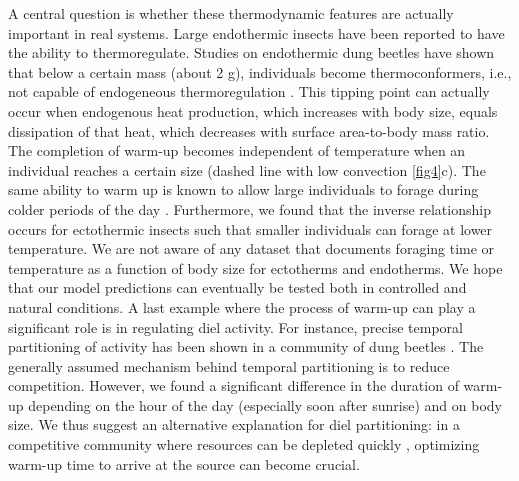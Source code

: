 A central question is whether these thermodynamic features are actually important in real systems.
Large endothermic insects have been reported to have the ability to thermoregulate.
Studies on endothermic dung beetles have shown that below a certain mass (about 2 g), individuals become thermoconformers, i.e., not capable of endogeneous thermoregulation \citep{Bartholomew1978, Verdu2006}.
This tipping point can actually occur when endogenous heat production, which increases with body size, equals dissipation of that heat, which decreases with surface area-to-body mass ratio.
The completion of warm-up becomes independent of temperature when an individual reaches a certain size (dashed line with low convection \cref{fig4}c).
The same ability to warm up is known to allow large individuals to forage during colder periods of the day \citep{May1985}.
Furthermore, we found that the inverse relationship occurs for ectothermic insects such that smaller individuals can forage at lower temperature.
We are not aware of any dataset that documents foraging time or temperature as a function of body size for ectotherms and endotherms. %
We hope that our model predictions can eventually be tested both in controlled and natural conditions.
A last example where the process of warm-up can play a significant role is in regulating diel activity. %
For instance, precise temporal partitioning of activity has been shown in a community of dung beetles \citep{Halffter1966, Caveney1995}.
The generally assumed mechanism behind temporal partitioning is to reduce competition.
However, we found a significant difference in the duration of warm-up depending on the hour of the day (especially soon after sunrise) and on body size.
We thus suggest an alternative explanation for diel partitioning: in a competitive community where resources can be depleted quickly \citep{Hanski1991}, optimizing warm-up time to arrive at the source can become crucial.


